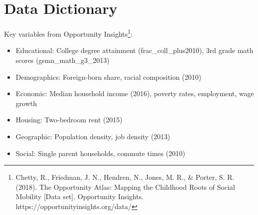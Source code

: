 \documentclass[11pt]{article}
\begin{document}
\section*{Data Dictionary}
Key variables from Opportunity Insights\footnote{Chetty, R., Friedman, J. N., Hendren, N., Jones, M. R., \& Porter, S. R. (2018). The Opportunity Atlas: Mapping the Childhood Roots of Social Mobility [Data set]. Opportunity Insights. https://opportunityinsights.org/data/}:
\begin{itemize}\setlength{\itemsep}{0pt}
    \item Educational: College degree attainment (frac\_coll\_plus2010), 3rd grade math scores (gsmn\_math\_g3\_2013)
    \item Demographics: Foreign-born share, racial composition (2010)
    \item Economic: Median household income (2016), poverty rates, employment, wage growth
    \item Housing: Two-bedroom rent (2015)
    \item Geographic: Population density, job density (2013)
    \item Social: Single parent households, commute times (2010)
\end{itemize}
\end{document}
